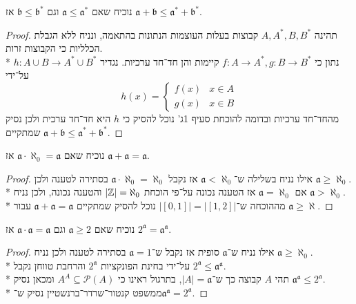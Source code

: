 \Subquestion{}
נוכיח שאם $\mathfrak{a} \le \mathfrak{a}^*$ וגם $\mathfrak{b} \le \mathfrak{b}^*$ אז $\mathfrak{a} + \mathfrak{b} \le \mathfrak{a}^* + \mathfrak{b}^*$.
\begin{proof}
	תהינה $A, A^*, B, B^*$ קבוצות בעלות העוצמות הנתונות בהתאמה, ונניח ללא הגבלת הכלליות כי הקבוצות זרות. \\*
	נתון כי $f : A \to A^*, g : B \to B^*$ קיימות והן חד־חד ערכיות.
	נגדיר $h : A \cup B \to A^* \cup B^*$ על־ידי
	\[
		h(x) = \begin{cases}
			f(x) & x \in A \\
			g(x) & x \in B
		\end{cases}
	\]
	מהחד־חד ערכיות ובדומה להוכחת סעיף 1ג' נוכל להסיק כי $h$ היא חד־חד ערכית ולכן נסיק שמתקיים $\mathfrak{a} + \mathfrak{b} \le \mathfrak{a}^* + \mathfrak{b}^*$.
\end{proof}

\Subquestion{}
נוכיח שאם $\mathfrak{a} \cdot \aleph_0 = \mathfrak{a}$ אז $\mathfrak{a} + \mathfrak{a} = \mathfrak{a}$.
\begin{proof}
	אילו נניח בשלילה ש־$\mathfrak{a} < \aleph_0$ אז נקבל $\mathfrak{a} \cdot \aleph_0 = \aleph_0$ בסתירה לטענה ולכן $\mathfrak{a} \ge \aleph_0$. \\*
	אם $\mathfrak{a} = \aleph_0$ אז הטענה נכונה על־פי הוכחת $|\mathbb{Z}| = \aleph_0$ והטענה נכונה, ולכן נניח $\mathfrak{a} > \aleph_0$. \\*
	מההוכחה ש־$|[0, 1]| = |[1, 2]|$ נוכל להסיק שמתקיים $\mathfrak{a} + \mathfrak{a} = \mathfrak{a}$ עבור $\mathfrak{a} \ge \aleph$.
\end{proof}

\Subquestion{}
נוכיח שאם $\mathfrak{a} \ge 2$ וגם $\mathfrak{a} \cdot \mathfrak{a} = \mathfrak{a}$ אז $2^\mathfrak{a} = \mathfrak{a}^\mathfrak{a}$.
\begin{proof}
	אילו נניח ש־$\mathfrak{a}$ סופית אז נקבל ש־$\mathfrak{a} = 1$ בסתירה לטענה ולכן נניח $\mathfrak{a} \ge \aleph_0$. \\*
	על־ידי בחינת הפונקציות $2^\mathfrak{a}$ והרחבת טווחן נקבל $2^\mathfrak{a} \le \mathfrak{a}^\mathfrak{a}$. \\*
	תהי $A$ קבוצה כך ש־$|A| = \mathfrak{a}$, בתרגול ראינו כי $A^A \subseteq \mathcal{P}(A)$ ומכאן נסיק $\mathfrak{a}^\mathfrak{a} \le 2^\mathfrak{a}$. \\*
	ממשפט קנטור־שרדר־ברנשטיין נסיק ש־$\mathfrak{a}^\mathfrak{a} = 2^\mathfrak{a}$.
\end{proof}

